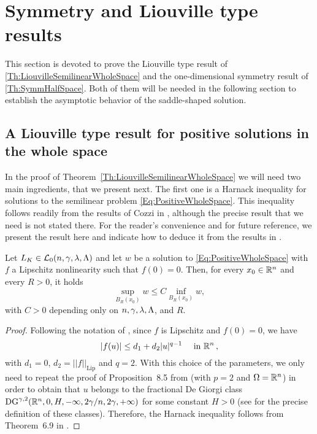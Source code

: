 \section{Symmetry and Liouville type results}
\label{Sec:SymmetryResults}




This section is devoted to prove the Liouville type result of \ref{Th:LiouvilleSemilinearWholeSpace} and the one-dimensional symmetry result of \ref{Th:SymmHalfSpace}. Both of them will be needed in the following section to establish the asymptotic behavior of the saddle-shaped solution. 

\subsection{A Liouville type result for positive solutions in the whole space}

In the proof of Theorem~\ref{Th:LiouvilleSemilinearWholeSpace} we will need two main ingredients, that we present next. The first one is a Harnack inequality for solutions to the semilinear problem \eqref{Eq:PositiveWholeSpace}. This inequality follows readily from the results of Cozzi in \cite{Cozzi-DeGiorgiClassesLong}, although the precise result that we need is not stated there. For the reader's convenience and for future reference, we present the result here and indicate how to deduce it from the results in \cite{Cozzi-DeGiorgiClassesLong}.

\begin{proposition}
	\label{Prop:HarnackSemilinear}
	Let $L_K\in\mathcal{L}_0(n,\gamma,\lambda,\Lambda)$ and let $w$ be a solution to \eqref{Eq:PositiveWholeSpace} with $f$ a Lipschitz nonlinearity such that $f(0) = 0$. Then, for every $x_0 \in \mathbb{R}^n$ and every $R>0$, it holds
	$$
	\sup_{B_R(x_0)} w \leq C  \inf_{B_R(x_0)} w, 
	$$
	with $C>0$  depending only on $n,\gamma,\lambda,\Lambda$, and $R$.
\end{proposition}

\begin{proof}
	Following the notation of \cite{Cozzi-DeGiorgiClassesLong}, since $f$ is Lipschitz and $f(0) = 0$, we have
	$$
	|f(u)|\leq d_1 + d_2 |u|^{q-1} \quad \text{ in } \mathbb{R}^n\,,
	$$ 
	with $d_1=0$, $d_2 =||f||_{\mathrm{Lip}}$ and $q=2$. With this choice of the parameters, we only need to repeat the proof of Proposition~8.5 from \cite{Cozzi-DeGiorgiClassesLong} (with $p=2$ and $\Omega = \mathbb{R}^n$) in order to obtain that $u$ belongs to the fractional De Giorgi class $\mathrm{DG}^{\gamma,2} ( \mathbb{R}^n , 0, H, -\infty,2\gamma/n,2\gamma,+\infty)$	for some constant $H>0$ (see \cite{Cozzi-DeGiorgiClassesLong} for the precise definition of these classes). Therefore, the Harnack inequality follows from Theorem~6.9 in \cite{Cozzi-DeGiorgiClassesLong}.
\end{proof}


